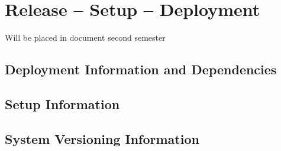 
\chapter{Release -- Setup -- Deployment}
Will be placed in document second semester


\section{Deployment Information and Dependencies}



\section{Setup Information}



\section{System  Versioning Information}
